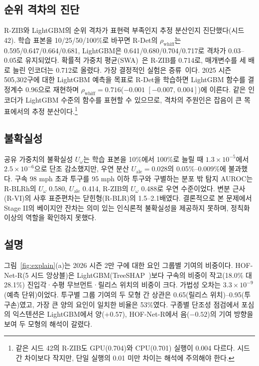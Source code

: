 \documentclass[journal,a4paper,10pt]{IEEEtran}
\begin{document}
\subsection{순위 격차의 진단}
\label{sec:diag}
R-ZIB와 LightGBM의 순위 격차가 표현력 부족인지 추정 분산인지 진단했다(시드 42). 학습 표본을 10/25/50/100\%로 바꾸면 R-Det의 $\rho_{\mathrm{whiff}}$는 0.595/0.647/0.664/0.681, LightGBM은 0.641/0.680/0.704/0.717로 격차가 0.03–0.05로 유지되었다. 확률적 가중치 평균(SWA)~\cite{izmailov2018averaging}은 R-ZIB를 0.714로, 매개변수를 세 배로 늘린 인코더는 0.712로 올렸다. 가장 결정적인 실험은 증류~\cite{hinton2015distilling}이다. 2025 시즌 505,302구에 대한 LightGBM 예측을 목표로 R-Det을 학습하면 LightGBM 함수를 결정계수 0.96으로 재현하며 $\rho_{\mathrm{whiff}}=0.716$($-0.001$ $[-0.007,\,0.004]$)에 이른다. 같은 인코더가 LightGBM 수준의 함수를 표현할 수 있으므로, 격차의 주원인은 잡음이 큰 목표에서의 추정 분산이다.\footnote{같은 시드 42의 R-ZIB도 GPU(0.704)와 CPU(0.701) 실행이 0.004 다르다. 시드 간 차이보다 작지만, 단일 실행의 0.01 미만 차이는 해석에 주의해야 한다.}

\subsection{불확실성}
공유 가중치의 불확실성 $U_\omega$는 학습 표본을 10\%에서 100\%로 늘릴 때 $1.3\times10^{-5}$에서 $2.5\times10^{-6}$으로 단조 감소했지만, 우연 분산 $U_{\mathrm{ale}}=0.028$의 0.05\%–0.009\%에 불과했다. 구속 98 mph 초과 투구를 95 mph 이하 투구와 구별하는 분포 밖 탐지 AUROC는 R-BLRh의 $U_\omega$ 0.580, $U_{\mathrm{ale}}$ 0.414, R-ZIB의 $U_\omega$ 0.488로 우연 수준이었다. 변분 근사(R-VI)의 사후 표준편차는 닫힌형(R-BLR)의 1.5–2.1배였다. 결론적으로 본 문제에서 Stage II의 베이지안 잔차는 의미 있는 인식론적 불확실성을 제공하지 못하며, 정칙화 이상의 역할을 확인하지 못했다.

\subsection{설명}
그림~\ref{fig:explain}(a)는 2026 시즌 2만 구에 대한 요인 그룹별 기여의 비중이다. HOF-Net-R(5 시드 앙상블)은 LightGBM(TreeSHAP~\cite{lundberg2020local})보다 구속의 비중이 작고(18.0\% 대 28.1\%) 진입각·수평 무브먼트·릴리스 위치의 비중이 크다. 가법성 오차는 $3.3\times10^{-9}$(예측 단위)이었다. 투구별 그룹 기여의 두 모형 간 상관은 0.65(릴리스 위치)–0.95(투구손)였고, 가장 큰 양의 요인이 일치한 비율은 53\%였다. 구종별 단조성 점검에서 포심의 익스텐션은 LightGBM에서 양($+0.57$), HOF-Net-R에서 음($-0.52$)의 기여 방향을 보여 두 모형의 해석이 갈렸다.
\end{document}
